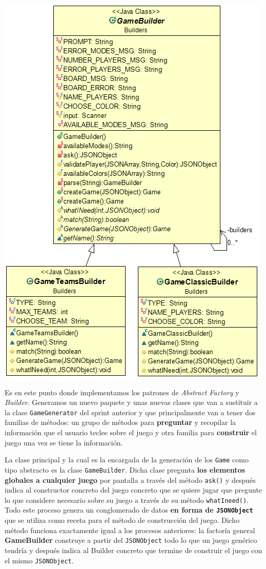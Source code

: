 \documentclass[../DocumentoOficial.tex]{subfiles}
\begin{document}
\begin{sprint}[4]
\begin{center}
\includegraphics[scale=0.47]{BuildersClassDiagram.png}
\end{center}

Es en este punto donde implementamos los patrones de \textit{Abstract Factory} y \textit{Builder}. Generamos un nuevo paquete y unas nuevas clases que van a sustituir a la clase \texttt{GameGenerator} del sprint anterior y que principalmente van a tener dos familias de métodos: un grupo de métodos para \textbf{preguntar} y recopilar la información que el usuario teclee sobre el juego y otra familia para \textbf{construir} el juego una vez se tiene la información.

La clase principal y la cual es la encargada de la generación de los \texttt{Game} como tipo abstracto es la clase \texttt{GameBuilder}. Dicha clase pregunta \textbf{los elementos globales a cualquier juego} por pantalla a través del método \texttt{ask()} y después indica al constructor concreto del juego concreto que se quiere jugar que pregunte lo que considere necesario sobre su juego a través de su método \texttt{whatIneed()}. Todo este proceso genera un conglomerado de datos \textbf{en forma de \texttt{JSONObject}} que se utiliza como receta para el método de construcción del juego. Dicho método funciona exactamente igual a los procesos anteriores: la factoría general \textbf{GameBuilder} construye a partir del \texttt{JSONObject} todo lo que un juego genérico tendría y después indica al Builder concreto que termine de construir el juego con el mismo \texttt{JSONObject}.


\end{sprint}
\end{document}
